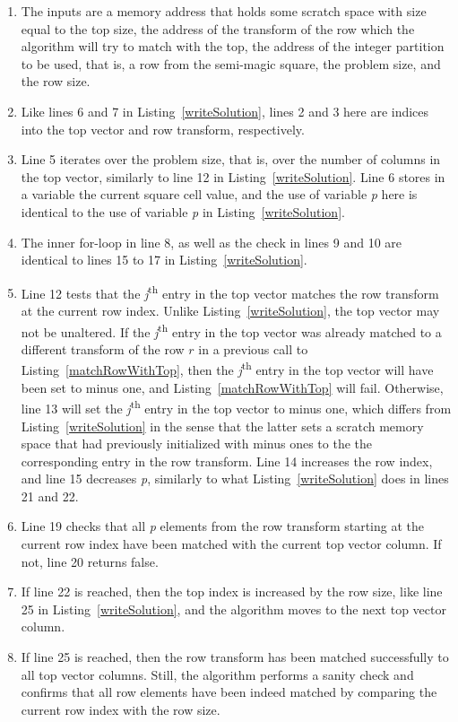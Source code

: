 \begin{enumerate}
\item The inputs are a memory address that holds some scratch space with size equal to the top size, the address of the transform of the row which the algorithm will try to match with the top, the address of the integer partition to be used, that is, a row from the semi-magic square, the problem size, and the row size.
\item Like lines 6 and 7 in Listing~\ref{writeSolution}, lines 2 and 3 here are indices into the top vector and row transform, respectively.
\addtocounter{enumi}{2}
\item Line 5 iterates over the problem size, that is, over the number of columns in the top vector, similarly to line 12 in Listing~\ref{writeSolution}. Line 6 stores in a variable the current square cell value, and the use of variable \emph{p} here is identical to the use of variable \emph{p} in Listing~\ref{writeSolution}.
\addtocounter{enumi}{2}
\item The inner for-loop in line 8, as well as the check in lines 9 and 10 are identical to lines 15 to 17 in Listing~\ref{writeSolution}.
\addtocounter{enumi}{3}
\item Line 12 tests that the \emph{j}\textsuperscript{th} entry in the top vector matches the row transform at the current row index. Unlike Listing~\ref{writeSolution}, the top vector may not be unaltered. If the \emph{j}\textsuperscript{th} entry in the top vector was already matched to a different transform of the row $r$ in a previous call to Listing~\ref{matchRowWithTop}, then the \emph{j}\textsuperscript{th} entry in the top vector will have been set to minus one, and Listing~\ref{matchRowWithTop} will fail. Otherwise, line 13 will set the \emph{j}\textsuperscript{th} entry in the top vector to minus one, which differs from Listing~\ref{writeSolution} in the sense that the latter sets a scratch memory space that had previously initialized with minus ones to the the corresponding entry in the row transform. Line 14 increases the row index, and line 15 decreases \emph{p}, similarly to what Listing~\ref{writeSolution} does in lines 21 and 22.
\addtocounter{enumi}{6}
\item Line 19 checks that all \emph{p} elements from the row transform starting at the current row index have been matched with the current top vector column. If not, line 20 returns false.
\addtocounter{enumi}{2}
\item If line 22 is reached, then the top index is increased by the row size, like line 25 in Listing~\ref{writeSolution}, and the algorithm moves to the next top vector column.
\addtocounter{enumi}{2}
\item If line 25 is reached, then the row transform has been matched successfully to all top vector columns. Still, the algorithm performs a sanity check and confirms that all row elements have been indeed matched by comparing the current row index with the row size.
\end{enumerate}

